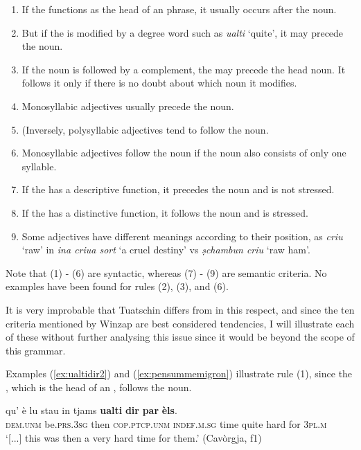 \begin{enumerate}
\item If the  functions as the head of an  phrase, it usually occurs after the noun.
\item But if the  is modified by a degree word such as \textit{ualti} `quite', it may precede the noun.
\item If the noun is followed by a complement, the  may precede the head noun. It follows it only if there is no doubt about which noun it modifies.
\item Monosyllabic adjectives usually precede the noun.
\item (Inversely, polysyllabic adjectives tend to follow the noun.
\item Monosyllabic adjectives follow the noun if the noun also consists of only one syllable.
\item If the  has a descriptive function, it precedes the noun and is not stressed.
\item If the  has a distinctive function, it follows the noun and is stressed.
\item Some adjectives have different meanings according to their position, as \textit{criu} `raw' in \textit{ina criua sort} `a cruel destiny' vs \textit{ṣchambun criu} `raw ham'.
\end{enumerate}	

Note that (1) - (6) are syntactic, whereas (7) - (9) are semantic criteria. No examples have been found for rules (2), (3), and (6).

It is very improbable that Tuatschin differs from  in this respect, and since the ten criteria mentioned by Winzap are best considered tendencies, I will illustrate each of these without further analysing this issue since it would be beyond the scope of this grammar.

Examples (\ref{ex:ualtidir2}) and (\ref{ex:pensummemigron}) illustrate rule (1), since the , which is the head of an , follows the noun.
 
\ea
\label{ex:ualtidir2}
\gll  [...] qu’ è lu stau in tjams \textbf{ualti} \textbf{dir} \textbf{par} \textbf{èls}. \\
{} \textsc{dem.unm} be.\textsc{prs.3sg} then \textsc{cop.ptcp.unm} \textsc{indef.m.sg} time quite hard for \textsc{3pl.m} \\
\glt `[...] this was then a very hard time for them.' (Cavòrgja, f1)
\z

